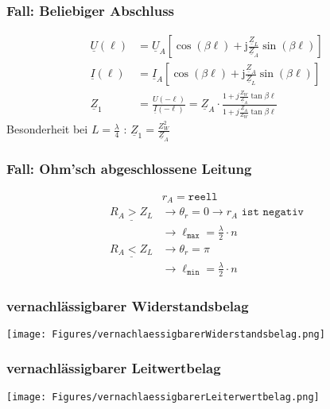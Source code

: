 \subsubsection{Fall: Beliebiger Abschluss}
\begin{align*}
    \underline{U}(\ell) &= \underline{U}_A\left[\cos (\beta \ell)+\mathrm{j} \frac{\underline{Z}_L}{\underline{Z}_A} \sin (\beta \ell)\right] \\
    \underline{I}(\ell) &= \underline{I}_A\left[\cos (\beta \ell)+\mathrm{j} \frac{\underline{Z}_A}{\underline{Z}_L} \sin (\beta \ell)\right] \\
    \underline{Z}_1     &= \frac{U(-\ell)}{\underline{I}(-\ell)}= \underline{Z}_A \cdot \frac{1+j \frac{Z_W}{\underline{Z}_A} \tan \beta \ell}{1+j \frac{\underline{Z}_A}{Z_W} \tan \beta \ell} 
\end{align*}
Besonderheit bei $L=\frac{\lambda}{4}$ :
$ \underline{Z}_1=\frac{Z_{W}^2}{\underline{Z}_A}$

\subsubsection{Fall: Ohm'sch abgeschlossene Leitung}
\begin{align*}
                          & r_A = \texttt{reell} \\
    \underline{R_A > Z_L} & \rightarrow\theta_r = 0 \rightarrow r_A \texttt{ ist negativ} \\
                          & \rightarrow \ell_\texttt{max}=\frac{\lambda}{2}\cdot n \\
    \underline{R_A < Z_L} & \rightarrow\theta_r = \pi                           \\
                          & \rightarrow \ell_\texttt{min}=\frac{\lambda}{2}\cdot n
\end{align*}


\subsubsection{vernachlässigbarer Widerstandsbelag}
\texttt{[image: Figures/vernachlaessigbarerWiderstandsbelag.png]}

\subsubsection{vernachlässigbarer Leitwertbelag}
\texttt{[image: Figures/vernachlaessigbarerLeiterwertbelag.png]}

